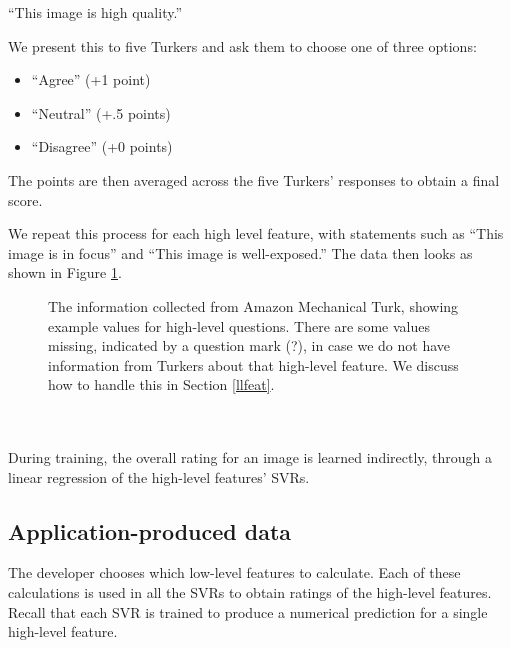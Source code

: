 \documentclass[11pt,letter]{article}
\begin{document}
``This image is high quality.''

We present this to five Turkers and ask them to choose one of three options:

\begin{itemize}
\item ``Agree'' (+1 point)
\item ``Neutral'' (+.5 points)
\item ``Disagree'' (+0 points)
\end{itemize}
The points are then averaged across the five Turkers' responses to obtain a final score.

We repeat this process for each high level feature, with statements such as ``This image is in focus'' and ``This image is well-exposed.'' The data then looks as shown in Figure \ref{fig:turktable}.

\begin{figure}
\centering
{}
\caption{The information collected from Amazon Mechanical Turk, showing example values for high-level questions. There are some values missing, indicated by a question mark (?), in case we do not have information from Turkers about that high-level feature. We discuss how to handle this in Section \ref{llfeat}.}
\label{fig:turktable}
\end{figure}

\\
\\

During training, the overall rating for an image is learned indirectly, through a linear regression of the high-level features' SVRs.

\subsection{Application-produced data}
The developer chooses which low-level features to calculate. Each of these calculations is used in all the SVRs to obtain ratings of the high-level features. Recall that each SVR is trained to produce a numerical prediction for a single high-level feature.
\end{document}

